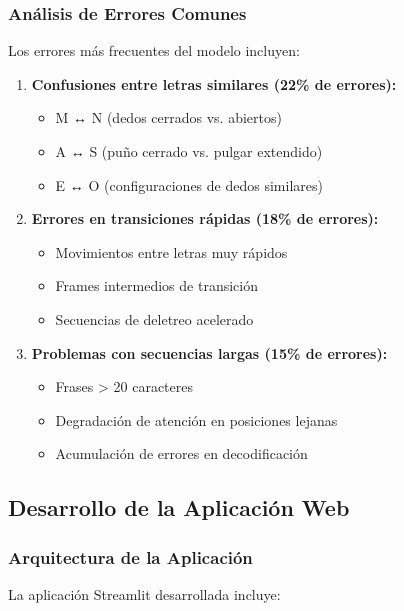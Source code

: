 \documentclass[12pt,a4paper]{article}
\begin{document}
\subsubsection{Análisis de Errores Comunes}
Los errores más frecuentes del modelo incluyen:
\begin{enumerate}
    \item \textbf{Confusiones entre letras similares (22\% de errores):}
    \begin{itemize}
        \item M ↔ N (dedos cerrados vs. abiertos)
        \item A ↔ S (puño cerrado vs. pulgar extendido)
        \item E ↔ O (configuraciones de dedos similares)
    \end{itemize}
    
    \item \textbf{Errores en transiciones rápidas (18\% de errores):}
    \begin{itemize}
        \item Movimientos entre letras muy rápidos
        \item Frames intermedios de transición
        \item Secuencias de deletreo acelerado
    \end{itemize}
    
    \item \textbf{Problemas con secuencias largas (15\% de errores):}
    \begin{itemize}
        \item Frases > 20 caracteres
        \item Degradación de atención en posiciones lejanas
        \item Acumulación de errores en decodificación
    \end{itemize}
\end{enumerate}

\subsection{Desarrollo de la Aplicación Web}

\subsubsection{Arquitectura de la Aplicación}
La aplicación Streamlit desarrollada incluye:
\end{document}
